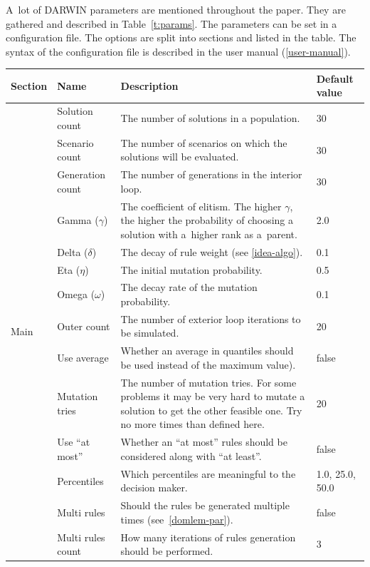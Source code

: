 A~lot of DARWIN parameters are mentioned throughout the paper. They are
gathered and described in Table~\ref{t:params}. The parameters can be set in a
configuration file. The options are split into sections and listed in the
table. The syntax of the configuration file is described in the user manual
(\ref{user-manual}).

\begin{table}
  \centering
  \begin{tabular}{l l p{7cm} l}
    \hline
    Section &  Name & Description & Default value \\
    \hline
    \hline
    \multirow{15}{*}{Main} & 
    Solution count & The number of solutions in a population. & 30 \\
    & Scenario count & The number of scenarios on which the solutions will be evaluated.  & 30 \\
    & Generation count & The number of generations in the interior loop. & 30 \\
    & Gamma ($\gamma$) & The coefficient of elitism. The higher $\gamma$, the
    higher the probability of choosing a solution with a~higher rank as
    a~parent. & 2.0  \\
    & Delta ($\delta$) & The decay of rule weight (see \ref{idea-algo}). & 0.1  \\
    & Eta ($\eta$) & The initial mutation probability.  & 0.5    \\
    & Omega ($\omega$)& The decay rate of the mutation probability. & 0.1  \\
    & Outer count & The number of exterior loop iterations to be simulated. & 20 \\
    & Use average & Whether an average in quantiles should be used instead of
    the maximum value). & false  \\
    & Mutation tries & The number of mutation tries. For some problems it may be
    very hard to mutate a solution to get the other feasible one. Try no more
    times than defined here.  & 20  \\
    & Use ``at most'' & Whether an ``at most'' rules should be considered
    along with ``at least''. & false \\
    & Percentiles & Which percentiles are meaningful to the decision maker. & 1.0, 25.0, 50.0  \\
    & Multi rules & Should the rules be generated multiple times (see~\ref{domlem-par}). & false \\
    & Multi rules count & How many iterations of rules generation should be performed. & 3 \\

\end{tabular}
\end{table}
